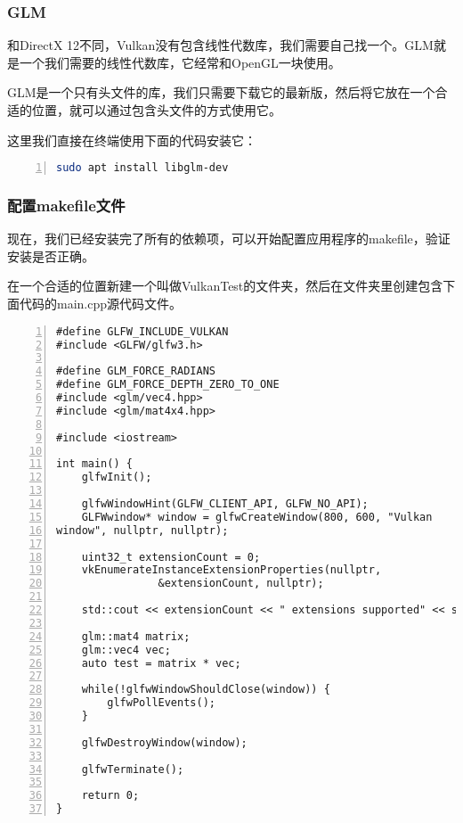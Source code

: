 \documentclass{ctexart}
\begin{document}
\subsubsection{GLM}

和DirectX 12不同，Vulkan没有包含线性代数库，我们需要自己找一个。GLM就是一个我们需要的线性代数库，它经常和OpenGL一块使用。

GLM是一个只有头文件的库，我们只需要下载它的最新版，然后将它放在一个合适的位置，就可以通过包含头文件的方式使用它。

这里我们直接在终端使用下面的代码安装它：

\begin{lstlisting}[language={bash},keywordstyle=\color{blue!70},commentstyle=\color{red!50!green!50!blue!50},frame=shadowbox, rulesepcolor=\color{red!20!green!20!blue!20},basicstyle=\small,numbers=left, numberstyle=\tiny,breaklines=true]
sudo apt install libglm-dev
\end{lstlisting}

\subsubsection{配置makefile文件}

现在，我们已经安装完了所有的依赖项，可以开始配置应用程序的makefile，验证安装是否正确。

在一个合适的位置新建一个叫做VulkanTest的文件夹，然后在文件夹里创建包含下面代码的main.cpp源代码文件。

\begin{lstlisting}[language={[ANSI]C},keywordstyle=\color{blue!70},commentstyle=\color{red!50!green!50!blue!50},frame=shadowbox, rulesepcolor=\color{red!20!green!20!blue!20},basicstyle=\small,numbers=left, numberstyle=\tiny,breaklines=true]
#define GLFW_INCLUDE_VULKAN
#include <GLFW/glfw3.h>

#define GLM_FORCE_RADIANS
#define GLM_FORCE_DEPTH_ZERO_TO_ONE
#include <glm/vec4.hpp>
#include <glm/mat4x4.hpp>

#include <iostream>

int main() {
	glfwInit();

	glfwWindowHint(GLFW_CLIENT_API, GLFW_NO_API);
	GLFWwindow* window = glfwCreateWindow(800, 600, "Vulkan
window", nullptr, nullptr);

	uint32_t extensionCount = 0;
	vkEnumerateInstanceExtensionProperties(nullptr,
				&extensionCount, nullptr);

	std::cout << extensionCount << " extensions supported" << std::endl;

	glm::mat4 matrix;
	glm::vec4 vec;
	auto test = matrix * vec;

	while(!glfwWindowShouldClose(window)) {
		glfwPollEvents();
	}

	glfwDestroyWindow(window);

	glfwTerminate();

	return 0;
}
\end{lstlisting}
\end{document}
